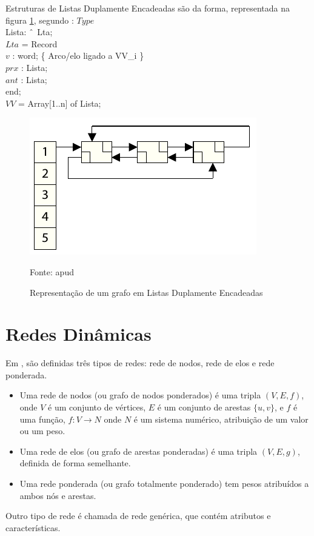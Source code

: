 Estruturas de Listas Duplamente Encadeadas são da forma, representada na figura \ref{fig:listdupla}, segundo \cite{negreirosbook}:
\FloatBarrier
\noindent $Type$\\
Lista: $\string^$ Lta;\\
$Lta$ = Record\\
$v$ : word; \{ Arco/elo ligado a VV\_i \}\\
$prx$ : Lista;\\
$ant$ : Lista;\\
end;\\
$VV$ = Array[1..n] of Lista;\\

\begin{figure}[htbp]
\centering
 \includegraphics[width=.45\textwidth]{chapters/fig/listdupla.png}
\caption{Representação de um grafo em Listas Duplamente Encadeadas}
Fonte: \cite{dynagraph} apud \cite{negreirosbook}
\label{fig:listdupla}
\end{figure}

\FloatBarrier

\section{Redes Dinâmicas}

Em \cite{harary}, são definidas três tipos de redes: rede de nodos, rede de elos e rede ponderada.
\begin{itemize}
\item Uma rede de nodos (ou grafo de nodos ponderados) é uma tripla $(V, E, f)$, onde $V$ é um conjunto
de vértices, $E$ é um conjunto de arestas $\{u,v\}$, e $f$ é uma função, $f: V \rightarrow N$ onde $N$
é um sistema numérico, atribuição de um valor ou um peso.
\item Uma rede de elos (ou grafo de arestas ponderadas) é uma tripla $(V, E, g)$, definida de forma semelhante.
\item Uma rede ponderada (ou grafo totalmente ponderado) tem pesos atribuídos a ambos nós e arestas.
\end{itemize}

Outro tipo de rede é chamada de rede genérica, que contém atributos e características.

